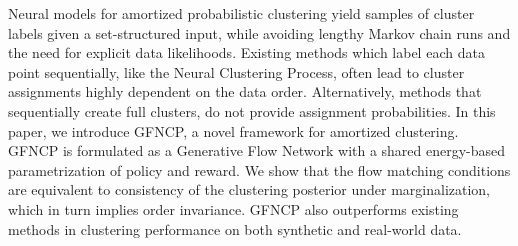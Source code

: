 




Neural models for amortized probabilistic clustering yield samples of cluster labels given a set-structured input, while avoiding lengthy Markov chain runs and the need for explicit data likelihoods.
%
Existing methods which label each data point 
sequentially, like the Neural Clustering Process, often lead to cluster assignments highly dependent on the data order.
Alternatively, methods that sequentially create full clusters, 
do not provide assignment probabilities.
%
In this paper, we introduce GFNCP, a novel framework for  amortized clustering.
%
GFNCP is formulated as a Generative Flow Network with a shared energy-based parametrization of policy and reward.
%
We show that the flow matching conditions are equivalent to consistency of the clustering posterior under marginalization, which in turn implies order invariance. 
%
GFNCP also outperforms existing methods in clustering performance on both synthetic and real-world data.



